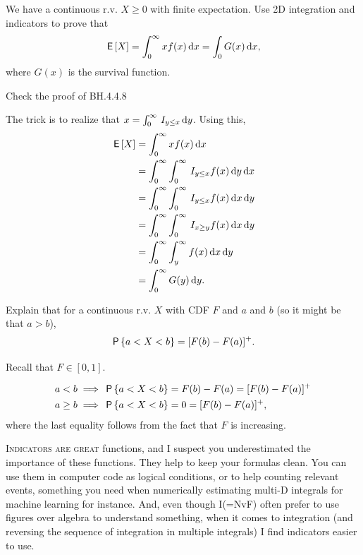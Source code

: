\documentclass[lectures]{subfiles}
\begin{document}
\begin{exercise}
We have a continuous r.v. $X\geq 0$ with finite expectation. Use 2D integration and indicators to prove that
\begin{align}
\E X = \int_{0}^{\infty} x f(x) \d x = \int_{0} G(x) \d x,
\end{align}
where $G(x)$ is the survival function.
\begin{hint}
  Check the proof of BH.4.4.8
\end{hint}
\begin{solution}
The trick is to realize that $x = \int_0^{\infty} \1{y\leq x} \d y$. Using this,
\begin{align}
\E X
&= \int_{0}^{\infty} x f(x) \d x \\
&= \int_{0}^{\infty} \int_{0}^{\infty} \1{y \leq x} f(x) \d y \d x \\
&= \int_{0}^{\infty} \int_{0}^{\infty} \1{y \leq x} f(x) \d x \d y \\
&= \int_{0}^{\infty} \int_{0}^{\infty} \1{x \geq y} f(x) \d x \d y \\
&= \int_{0}^{\infty} \int_{y}^{\infty} f(x) \d x \d y \\
&= \int_{0}^{\infty} G(y) \d y.
\end{align}
\end{solution}
\end{exercise}


\begin{exercise}
Explain that for a continuous r.v. $X$ with CDF $F$ and $a$ and $b$ (so it might be that $a>b$),
\begin{equation}
  \label{eq:87}
\P{a< X < b} = [F(b) - F(a)]^{+}.
\end{equation}
\begin{hint}
  Recall that $F\in [0, 1]$.
\end{hint}
\begin{solution}
\begin{align}
a<b & \implies \P{a< X < b} = F(b) - F(a) = [F(b) - F(a)]^{+} \\
a\geq b & \implies \P{a< X < b} =  0 = [F(b) - F(a)]^{+},
\end{align}
where the last equality follows from the fact that $F$ is increasing.
\end{solution}
\end{exercise}

\textsc{Indicators are great} functions, and I suspect you underestimated the importance of these functions.
They help to keep your formulas clean.
You can use them in computer code as logical conditions, or to help counting relevant events, something you need when numerically estimating multi-D integrals for machine learning for instance.
And, even though I(=NvF) often prefer to use figures over algebra to understand something, when it comes to integration (and reversing the sequence of integration in multiple integrals) I find indicators easier to use.
\end{document}
